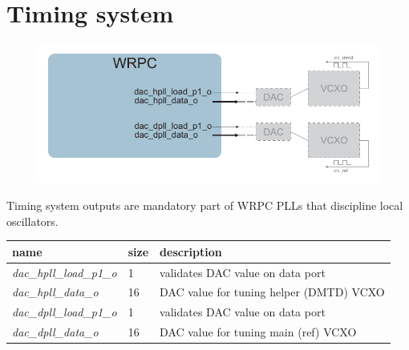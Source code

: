 \section{Timing system}
\label{sec:tim_sys}

\begin{figure}[ht]
  \begin{center}
    \includegraphics[width=.8\textwidth]{fig/wrpc_tsys.pdf}
  \end{center}
\end{figure}

Timing system outputs are mandatory part of WRPC PLLs that discipline local
oscillators.

\begin{center}
  \begin{tabular}{|l|l|p{11cm}|}
    \hline {\bf name} & {\bf size} & {\bf description} \\
    \hline
    \emph{dac\_hpll\_load\_p1\_o} & 1 & validates DAC value on data port \\
    \emph{dac\_hpll\_data\_o} & 16 & DAC value for tuning helper (DMTD) VCXO\\
    \hline
    \emph{dac\_dpll\_load\_p1\_o} & 1 & validates DAC value on data port \\
    \emph{dac\_dpll\_data\_o} & 16 & DAC value for tuning main (ref) VCXO\\
    \hline
  \end{tabular}
\end{center}
